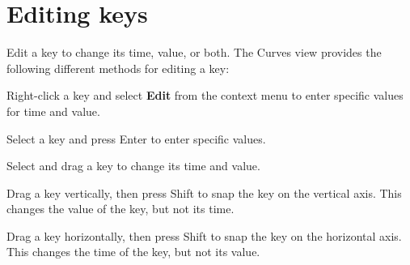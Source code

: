\chapter{Editing keys}
\hypertarget{md__hey_tea_9_2_library_2_package_cache_2com_8unity_8timeline_0d1_87_85_2_documentation_0i_2crv__keys__edit}{}\label{md__hey_tea_9_2_library_2_package_cache_2com_8unity_8timeline_0d1_87_85_2_documentation_0i_2crv__keys__edit}
\label{md__hey_tea_9_2_library_2_package_cache_2com_8unity_8timeline_0d1_87_85_2_documentation_0i_2crv__keys__edit_autotoc_md4638}%
%
 Edit a key to change its time, value, or both. The Curves view provides the following different methods for editing a key\+:


\begin{DoxyItemize}
\item Right-\/click a key and select {\bfseries{Edit}} from the context menu to enter specific values for time and value.
\item Select a key and press Enter to enter specific values.
\item Select and drag a key to change its time and value.
\item Drag a key vertically, then press Shift to snap the key on the vertical axis. This changes the value of the key, but not its time.
\item Drag a key horizontally, then press Shift to snap the key on the horizontal axis. This changes the time of the key, but not its value. 
\end{DoxyItemize}